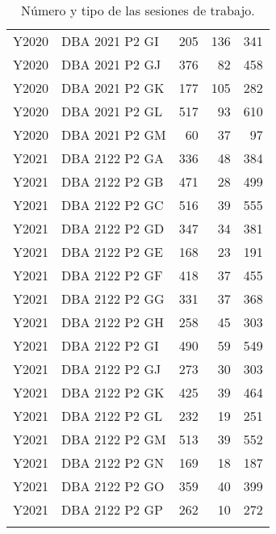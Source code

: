 \begin{longtable}{llrrr}
Y2020 & DBA 2021 P2 GI &   205 &     136 &  341 \\
Y2020 & DBA 2021 P2 GJ &   376 &      82 &  458 \\
Y2020 & DBA 2021 P2 GK &   177 &     105 &  282 \\
Y2020 & DBA 2021 P2 GL &   517 &      93 &  610 \\
Y2020 & DBA 2021 P2 GM &    60 &      37 &   97 \\
Y2021 & DBA 2122 P2 GA &   336 &      48 &  384 \\
Y2021 & DBA 2122 P2 GB &   471 &      28 &  499 \\
Y2021 & DBA 2122 P2 GC &   516 &      39 &  555 \\
Y2021 & DBA 2122 P2 GD &   347 &      34 &  381 \\
Y2021 & DBA 2122 P2 GE &   168 &      23 &  191 \\
Y2021 & DBA 2122 P2 GF &   418 &      37 &  455 \\
Y2021 & DBA 2122 P2 GG &   331 &      37 &  368 \\
Y2021 & DBA 2122 P2 GH &   258 &      45 &  303 \\
Y2021 & DBA 2122 P2 GI &   490 &      59 &  549 \\
Y2021 & DBA 2122 P2 GJ &   273 &      30 &  303 \\
Y2021 & DBA 2122 P2 GK &   425 &      39 &  464 \\
Y2021 & DBA 2122 P2 GL &   232 &      19 &  251 \\
Y2021 & DBA 2122 P2 GM &   513 &      39 &  552 \\
Y2021 & DBA 2122 P2 GN &   169 &      18 &  187 \\
Y2021 & DBA 2122 P2 GO &   359 &      40 &  399 \\
Y2021 & DBA 2122 P2 GP &   262 &      10 &  272 \\
\hline
\caption{Número y tipo de las sesiones de trabajo.}
\label{tab:type}
\end{longtable}

